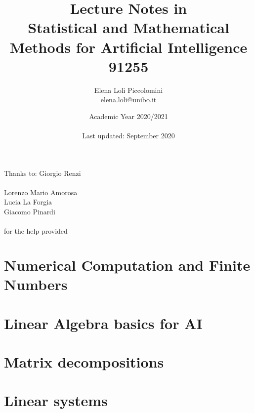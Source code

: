\documentclass[12pt]{article}
\title{Lecture Notes in \\ Statistical and Mathematical Methods for Artificial Intelligence \\ 91255}
\author{ Elena Loli Piccolomini\\ \href{mailto:elena.loli@unibo.it}{elena.loli@unibo.it}}
\date{Academic Year 2020/2021 \\~\\ Last updated: September 2020}
\theoremstyle{definition}
\begin{document}
\maketitle
\begin{center}
    \large{Thanks to: Giorgio Renzi\\~\\Lorenzo Mario Amorosa\\Lucia La Forgia\\Giacomo Pinardi\\~\\for the help provided}
\end{center}
\newpage
\tableofcontents
\newpage
{}

%

\section{Numerical Computation and Finite Numbers}


\section{Linear Algebra basics for AI}


\section{Matrix decompositions \label{sec:matdecomp}}
 

 \section{Linear systems \label{sec:syslin}}
 


%  

%  
 

%  
\end{document}
